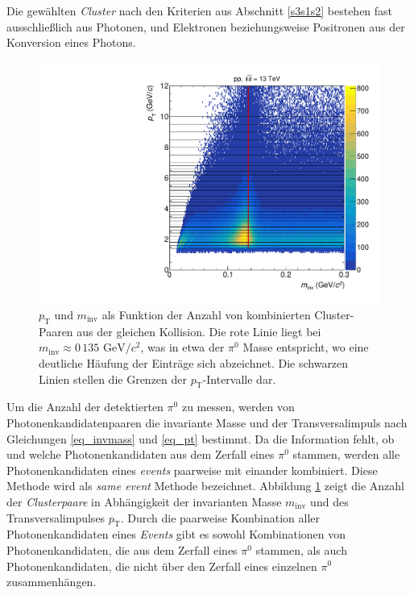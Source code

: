 Die gewählten \textit{Cluster} nach den Kriterien aus Abschnitt \ref{s3s1s2} bestehen fast ausschließlich aus Photonen, und  Elektronen beziehungsweise Positronen aus der Konversion eines Photons.
\begin{figure}[tp]
\centering
\includegraphics[width=.7\linewidth]{hInvMass_pT_Signal.pdf}
\caption{$p_\text{T}$ und $m_\text{inv}$ als Funktion der Anzahl von kombinierten  Cluster-Paaren aus der gleichen Kollision.
Die rote Linie liegt bei $m_{\text{inv}}\approx0\,135\text{ GeV/}c^{2}$, was in etwa der $\pi^{0}$ Masse entspricht, wo eine deutliche Häufung der Einträge sich abzeichnet.
Die schwarzen Linien stellen die Grenzen der $p_{\text{T}}$-Intervalle dar.}
\label{figInvMassPt_a}
\end{figure}
\newline
Um die Anzahl der detektierten $\pi^{0}$ zu messen, werden von Photonenkandidatenpaaren die invariante Masse und der Transversalimpuls nach Gleichungen \ref{eq_invmass} und \ref{eq_pt} bestimmt.
Da die Information fehlt, ob und welche Photonenkandidaten aus dem Zerfall eines $\pi^{0}$ stammen, werden alle Photonenkandidaten eines \textit{events} paarweise mit einander kombiniert.
Diese Methode wird als \textit{same event} Methode bezeichnet.
Abbildung \ref{figInvMassPt_a} zeigt die Anzahl der \textit{Clusterpaare} in Abhängigkeit der invarianten Masse $m_{\text{inv}}$ und des Transversalimpulses $p_{\text{T}}$.
Durch die paarweise Kombination aller Photonenkandidaten eines \textit{Events} gibt es sowohl Kombinationen von Photonenkandidaten, die aus dem Zerfall eines $\pi^{0}$ stammen, als auch Photonenkandidaten, die nicht über den Zerfall eines einzelnen $\pi^{0}$ zusammenhängen.
\newline

